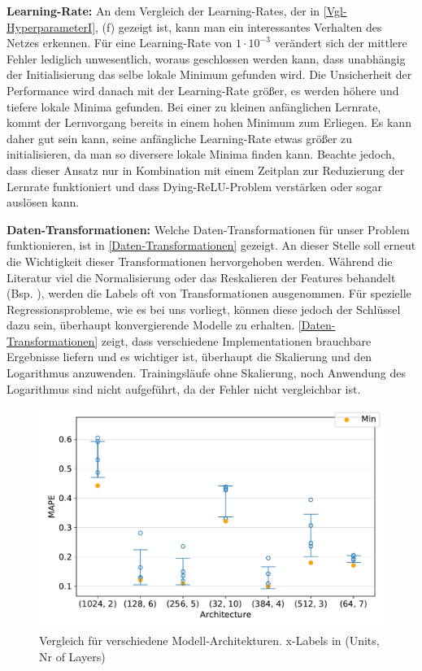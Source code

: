 \textbf{Learning-Rate:}
An dem Vergleich der Learning-Rates, der in \textsf{\autoref{Vgl-HyperparameterI}, (f)} gezeigt ist, kann man ein interessantes Verhalten des Netzes erkennen. Für eine Learning-Rate von $1 \cdot 10^{-3}$ verändert sich der mittlere Fehler lediglich unwesentlich, woraus geschlossen werden kann, dass unabhängig der Initialisierung das selbe lokale Minimum gefunden wird. Die Unsicherheit der Performance wird danach mit der Learning-Rate größer, es werden höhere und tiefere lokale Minima gefunden. Bei einer zu kleinen anfänglichen Lernrate, kommt der Lernvorgang bereits in einem hohen Minimum zum Erliegen. Es kann daher gut sein kann, seine anfängliche Learning-Rate etwas größer zu initialisieren, da man so diversere lokale Minima finden kann. Beachte jedoch, dass dieser Ansatz nur in Kombination mit einem Zeitplan zur Reduzierung der Lernrate funktioniert und dass \grqq Dying-ReLU\glqq-Problem verstärken oder sogar auslösen kann. 

\textbf{Daten-Transformationen:}
Welche Daten-Transformationen für unser Problem funktionieren, ist in \textsf{\autoref{Daten-Transformationen}} gezeigt. An dieser Stelle soll erneut die Wichtigkeit dieser Transformationen hervorgehoben werden. Während die Literatur viel die Normalisierung oder das Reskalieren der Features behandelt (Bsp. \cite{FN, feature-scaling}), werden die Labels oft von Transformationen ausgenommen. Für spezielle Regressionsprobleme, wie es bei uns vorliegt, können diese jedoch der Schlüssel dazu sein, überhaupt konvergierende Modelle zu erhalten. \textsf{\autoref{Daten-Transformationen}} zeigt, dass verschiedene Implementationen brauchbare Ergebnisse liefern und es wichtiger ist, überhaupt die Skalierung und den Logarithmus anzuwenden. Trainingsläufe ohne Skalierung, noch Anwendung des Logarithmus sind nicht aufgeführt, da der Fehler nicht vergleichbar ist.
\begin{figure}[b!]
	\centering
	\includegraphics[width=13cm]{graphics/33}
	\caption{Vergleich für verschiedene Modell-Architekturen.
		x-Labels in (Units, Nr of Layers)}
	\label{Vgl-Architekturen}
\end{figure}

